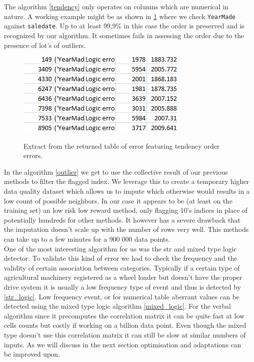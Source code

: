 \documentclass{article}
\begin{document}
The algorithm \ref{tendency} only operates on columns which are numerical in nature. A working example might be as shown in \ref{fig:exp_tendency} where we check \texttt{YearMade} against \texttt{saledate}. Up to at least 99,9\% in this case the order is preserved and is recognized by our algorithm. It sometimes fails in assessing the order due to the presence of lot's of outliers.
\begin{figure}[h]
    \centering
    \includegraphics[scale=0.8]{picture/exp_tendency.png}
    \label{fig:exp_tendency}
    \caption{Extract from the returned table of error featuring tendency order errors.}
\end{figure}

In the algorithm \ref{outlier} we get to use the collective result of our previous methods to filter the flagged index. We leverage this to create a temporary higher data quality dataset which allows us to impute which otherwise would results in a low count of possible neighbors. In our case it appears to be (at least on the training set) an low risk low reward method, only flagging 10's indices in place of potentially hundreds for other methods. It however has a severe drawback that the imputation doesn't scale up with the number of rows very well. This methods can take up to a few minutes for a 900 000 data points.\\


One of the most interesting algorithm for us was the str and mixed type logic detector. To validate this kind of error we had to check the frequency and the validity of certain association between categories.
Typically if a certain type of agricultural machinery registered as a wheel loader but doesn't have the proper drive system it is usually a low frequency type of event and thus is detected by \ref{str_logic}.
Low frequency event, or for numerical table aberrant values can be detected using the mixed type logic algorithm \ref{mixed_logic}. For the verbal algorithm since it precomputes the correlation matrix it can be quite fast at low cells counts but costly if working on a billion data point. Even though the mixed type doesn't use this correlation matrix it can still be slow at similar numbers of inputs.
As we will discuss in the next section optimisation and adaptations can be improved upon.
\end{document}
